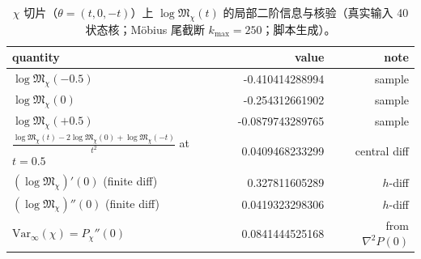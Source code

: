 \begin{table}[H]
\centering
\scriptsize
\setlength{\tabcolsep}{6pt}
\renewcommand{\arraystretch}{1.15}
\caption{$\chi$ 切片（$\theta=(t,0,-t)$）上 $\log\mathfrak{M}_\chi(t)$ 的局部二阶信息与核验（真实输入 40 状态核；Möbius 尾截断 $k_{\max}=250$；脚本生成）。}
\label{tab:real-input-40-logM-chi-local-derivatives}
\begin{tabular}{@{}lrr@{}}
\toprule
quantity & value & note \\
\midrule
$\log\mathfrak{M}_\chi(-0.5)$ & -0.410414288994 & sample \\
$\log\mathfrak{M}_\chi(0)$ & -0.254312661902 & sample \\
$\log\mathfrak{M}_\chi(+0.5)$ & -0.0879743289765 & sample \\
\midrule
$\frac{\log\mathfrak{M}_\chi(t)-2\log\mathfrak{M}_\chi(0)+\log\mathfrak{M}_\chi(-t)}{t^2}$ at $t=0.5$ & 0.0409468233299 & central diff \\
\midrule
$(\log\mathfrak{M}_\chi)'(0)$ (finite diff) & 0.327811605289 & $h$-diff \\
$(\log\mathfrak{M}_\chi)''(0)$ (finite diff) & 0.0419323298306 & $h$-diff \\
\midrule
$\mathrm{Var}_\infty(\chi)=P_\chi''(0)$ & 0.0841444525168 & from $\nabla^2 P(0)$ \\
\bottomrule
\end{tabular}
\end{table}
